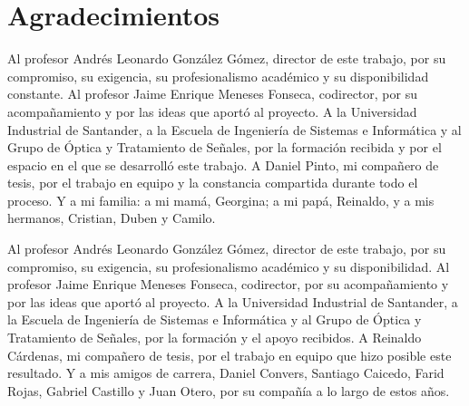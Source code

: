 \chapter*{Agradecimientos}

\begingroup
{}
\setlength{\parindent}{0pt}
\setlength{\parskip}{0.8em}

Al profesor Andrés Leonardo González Gómez, director de este trabajo, por su compromiso, su exigencia, su profesionalismo académico y su disponibilidad constante. Al profesor Jaime Enrique Meneses Fonseca, codirector, por su acompañamiento y por las ideas que aportó al proyecto. A la Universidad Industrial de Santander, a la Escuela de Ingeniería de Sistemas e Informática y al Grupo de Óptica y Tratamiento de Señales, por la formación recibida y por el espacio en el que se desarrolló este trabajo. A Daniel Pinto, mi compañero de tesis, por el trabajo en equipo y la constancia compartida durante todo el proceso. Y a mi familia: a mi mamá, Georgina; a mi papá, Reinaldo, y a mis hermanos, Cristian, Duben y Camilo.

\begin{flushright}\textit{\AutorUno}\end{flushright}

\vspace{2em}

Al profesor Andrés Leonardo González Gómez, director de este trabajo, por su compromiso, su exigencia, su profesionalismo académico y su disponibilidad. Al profesor Jaime Enrique Meneses Fonseca, codirector, por su acompañamiento y por las ideas que aportó al proyecto. A la Universidad Industrial de Santander, a la Escuela de Ingeniería de Sistemas e Informática y al Grupo de Óptica y Tratamiento de Señales, por la formación y el apoyo recibidos. A Reinaldo Cárdenas, mi compañero de tesis, por el trabajo en equipo que hizo posible este resultado. Y a mis amigos de carrera, Daniel Convers, Santiago Caicedo, Farid Rojas, Gabriel Castillo y Juan Otero, por su compañía a lo largo de estos años.

\begin{flushright}\textit{\AutorDos}\end{flushright}

\endgroup
